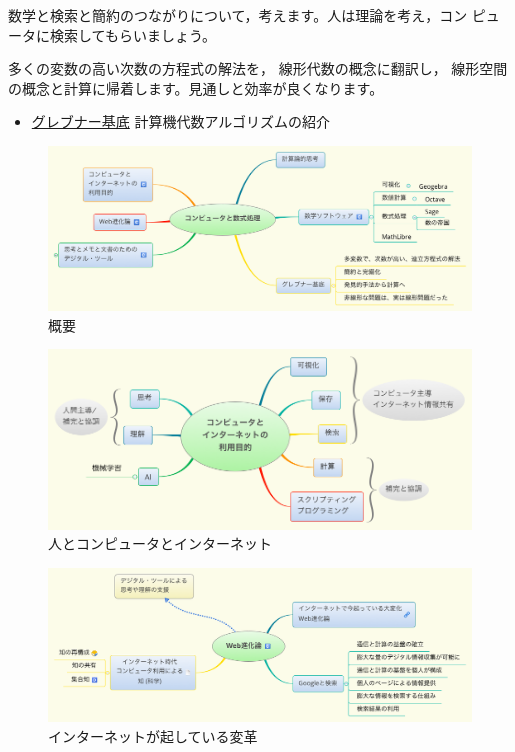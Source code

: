 \documentclass[dvipdfmx,11pat]{jarticle}
\begin{document}
数学と検索と簡約のつながりについて，考えます。人は理論を考え，コン
ピュータに検索してもらいましょう。

多くの変数の高い次数の方程式の解法を，
線形代数の概念に翻訳し，
線形空間の概念と計算に帰着します。見通しと効率が良くなります。

\begin{itemize}
\item \href{./org/groebner.org}{グレブナー基底} 計算機代数アルゴリズムの紹介
\end{itemize}

\begin{figure}[htbp]
\centering
\includegraphics[width=18cm]{./map-images/01-computer_and_cal.png}
\caption{概要}
\end{figure}

\begin{figure}[htbp]
\centering
\includegraphics[width=18cm]{./map-images/03-how_to_use_computer_and_internet.png}
\caption{人とコンピュータとインターネット}
\end{figure}


\vspace{3cm}

\begin{figure}[htbp]
\centering
\includegraphics[width=18cm]{./map-images/04-Web_revolution.png}
\caption{インターネットが起している変革}
\end{figure}
\end{document}
